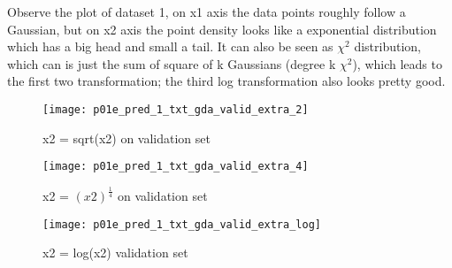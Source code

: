 \begin{answer}

Observe the plot of dataset 1, on x1 axis the data points
roughly follow a Gaussian, but on x2 axis the point density 
looks like a exponential distribution which has a big head
and small a tail. It can also be seen as $\chi^2$ distribution,
which can is just the sum of square of k Gaussians (degree k $\chi^2$),  
which leads to the first two transformation; the third log 
transformation also looks pretty good.

    \begin{figure}[h]
        \centering
        \texttt{[image: p01e\_pred\_1\_txt\_gda\_valid\_extra\_2]}
        \caption{ x2 = sqrt(x2) on validation set}
    \end{figure}
    
    \begin{figure}[h]
        \centering
        \texttt{[image: p01e\_pred\_1\_txt\_gda\_valid\_extra\_4]}
        \caption{ x2 = $(x2)^{\frac{1}{4}}$ on validation set }
    \end{figure}
    
    \begin{figure}[h]
        \centering
        \texttt{[image: p01e\_pred\_1\_txt\_gda\_valid\_extra\_log]}
        \caption{ x2 = log(x2) validation set }
    \end{figure}

\end{answer}
